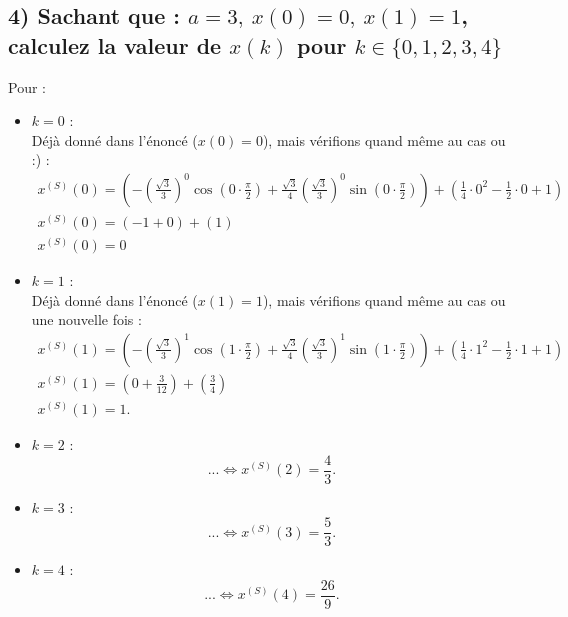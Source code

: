 \documentclass[11pt,a4paper]{report}
\begin{document}
		\subsection*{4) Sachant que : $a=3,\ x(0) = 0,\ x(1) = 1$, calculez la valeur de $x(k)$ pour $k \in \{ 0,1,2,3,4 \}$}
			Pour :
			\begin{itemize}
			\item $k = 0$ : \\
				Déjà donné dans l'énoncé ($x(0) = 0$), mais vérifions quand même au cas ou :) :
				\begin{gather*}
					x^{(S)}(0) = \left( -\left(\frac{\sqrt{3}}{3} \right)^0 \cos\left(0 \cdot \frac{\pi}{2}\right) + \frac{\sqrt{3}}{4} \left(\frac{\sqrt{3}}{3}\right)^0 \sin\left(0 \cdot \frac{\pi}{2}\right)\right) + \left(\frac{1}{4} \cdot 0^2 - \frac{1}{2} \cdot 0 + 1 \right) \\
					x^{(S)}(0) = (-1 + 0) + (1)\\
					x^{(S)}(0) = 0
				\end{gather*}

			\item $k = 1$ : \\
				Déjà donné dans l'énoncé ($x(1) = 1$), mais vérifions quand même au cas ou une nouvelle fois :
				\begin{gather*}
					x^{(S)}(1) = \left( -\left(\frac{\sqrt{3}}{3} \right)^1 \cos\left(1 \cdot \frac{\pi}{2}\right) + \frac{\sqrt{3}}{4} \left(\frac{\sqrt{3}}{3}\right)^1 \sin\left(1 \cdot \frac{\pi}{2}\right)\right) + \left(\frac{1}{4} \cdot 1^2 - \frac{1}{2} \cdot 1 + 1 \right) \\
					x^{(S)}(1) = \left(0 + \frac{3}{12}\right) + \left(\frac{3}{4}\right)\\
					x^{(S)}(1) = 1.
				\end{gather*}

			\item $k = 2$ :\\
				\[
					... \Leftrightarrow x^{(S)}(2) = \frac{4}{3}.
				\]

			\item $k = 3$ :\\
				\[
					... \Leftrightarrow x^{(S)}(3) = \frac{5}{3}.
				\]

			\item $k = 4$ :\\
				\[
					... \Leftrightarrow x^{(S)}(4) = \frac{26}{9}.
				\]
			\end{itemize}
\end{document}
